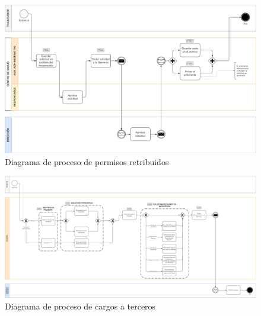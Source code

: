 \documentclass[12pt, a4paper, twoside, openright]{report}
\begin{document}
\begin{figure}
    \centering
    \begin{sideways}
        \includegraphics[width=0.95\textheight]{img/proceso-permisos.png}
    \end{sideways}
    \caption{Diagrama de proceso de permisos retribuidos}
    \label{fig:proceso-permisos}
\end{figure}

\begin{figure}
    \centering
    \begin{sideways}
        \includegraphics[width=0.95\textheight]{img/proceso-cargos.png}
    \end{sideways}
    \caption{Diagrama de proceso de cargos a terceros}
    \label{fig:proceso-cargos}
\end{figure}
\end{document}
